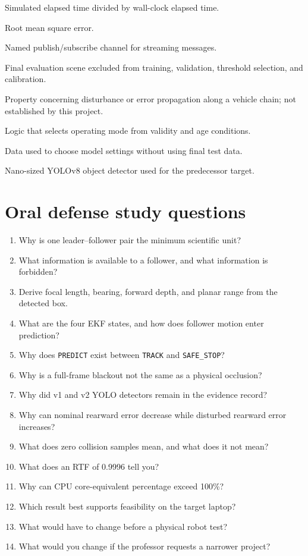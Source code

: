 \documentclass[11pt,oneside,openany]{book}
\newcommand{\state}[1]{\texttt{#1}}
\begin{document}
\begin{description}[style=nextline,leftmargin=2em]
\item[Real-time factor] Simulated elapsed time divided by wall-clock elapsed time.
\item[RMSE] Root mean square error.
\item[ROS topic] Named publish/subscribe channel for streaming messages.
\item[Sealed test scene] Final evaluation scene excluded from training, validation, threshold selection, and calibration.
\item[String stability] Property concerning disturbance or error propagation along a vehicle chain; not established by this project.
\item[Supervisor] Logic that selects operating mode from validity and age conditions.
\item[Validation data] Data used to choose model settings without using final test data.
\item[YOLOv8n] Nano-sized YOLOv8 object detector used for the predecessor target.
\end{description}

\chapter{Oral defense study questions}

\begin{enumerate}
  \item Why is one leader--follower pair the minimum scientific unit?
  \item What information is available to a follower, and what information is forbidden?
  \item Derive focal length, bearing, forward depth, and planar range from the detected box.
  \item What are the four EKF states, and how does follower motion enter prediction?
  \item Why does \state{PREDICT} exist between \state{TRACK} and \state{SAFE\_STOP}?
  \item Why is a full-frame blackout not the same as a physical occlusion?
  \item Why did v1 and v2 YOLO detectors remain in the evidence record?
  \item Why can nominal rearward error decrease while disturbed rearward error increases?
  \item What does zero collision samples mean, and what does it not mean?
  \item What does an RTF of 0.9996 tell you?
  \item Why can CPU core-equivalent percentage exceed 100\%?
  \item Which result best supports feasibility on the target laptop?
  \item What would have to change before a physical robot test?
  \item What would you change if the professor requests a narrower project?
\end{enumerate}
\end{document}
